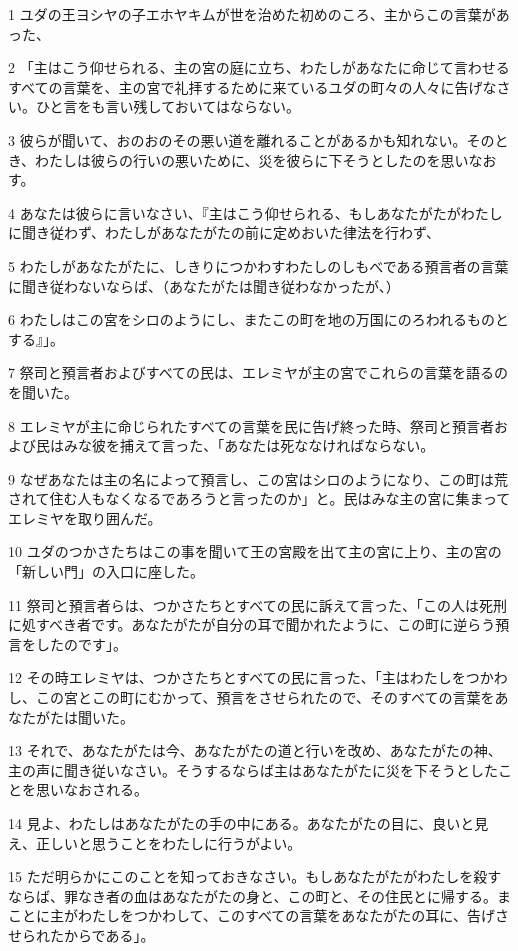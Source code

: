 \par 1 ユダの王ヨシヤの子エホヤキムが世を治めた初めのころ、主からこの言葉があった、
\par 2 「主はこう仰せられる、主の宮の庭に立ち、わたしがあなたに命じて言わせるすべての言葉を、主の宮で礼拝するために来ているユダの町々の人々に告げなさい。ひと言をも言い残しておいてはならない。
\par 3 彼らが聞いて、おのおのその悪い道を離れることがあるかも知れない。そのとき、わたしは彼らの行いの悪いために、災を彼らに下そうとしたのを思いなおす。
\par 4 あなたは彼らに言いなさい、『主はこう仰せられる、もしあなたがたがわたしに聞き従わず、わたしがあなたがたの前に定めおいた律法を行わず、
\par 5 わたしがあなたがたに、しきりにつかわすわたしのしもべである預言者の言葉に聞き従わないならば、（あなたがたは聞き従わなかったが、）
\par 6 わたしはこの宮をシロのようにし、またこの町を地の万国にのろわれるものとする』」。
\par 7 祭司と預言者およびすべての民は、エレミヤが主の宮でこれらの言葉を語るのを聞いた。
\par 8 エレミヤが主に命じられたすべての言葉を民に告げ終った時、祭司と預言者および民はみな彼を捕えて言った、「あなたは死ななければならない。
\par 9 なぜあなたは主の名によって預言し、この宮はシロのようになり、この町は荒されて住む人もなくなるであろうと言ったのか」と。民はみな主の宮に集まってエレミヤを取り囲んだ。
\par 10 ユダのつかさたちはこの事を聞いて王の宮殿を出て主の宮に上り、主の宮の「新しい門」の入口に座した。
\par 11 祭司と預言者らは、つかさたちとすべての民に訴えて言った、「この人は死刑に処すべき者です。あなたがたが自分の耳で聞かれたように、この町に逆らう預言をしたのです」。
\par 12 その時エレミヤは、つかさたちとすべての民に言った、「主はわたしをつかわし、この宮とこの町にむかって、預言をさせられたので、そのすべての言葉をあなたがたは聞いた。
\par 13 それで、あなたがたは今、あなたがたの道と行いを改め、あなたがたの神、主の声に聞き従いなさい。そうするならば主はあなたがたに災を下そうとしたことを思いなおされる。
\par 14 見よ、わたしはあなたがたの手の中にある。あなたがたの目に、良いと見え、正しいと思うことをわたしに行うがよい。
\par 15 ただ明らかにこのことを知っておきなさい。もしあなたがたがわたしを殺すならば、罪なき者の血はあなたがたの身と、この町と、その住民とに帰する。まことに主がわたしをつかわして、このすべての言葉をあなたがたの耳に、告げさせられたからである」。
